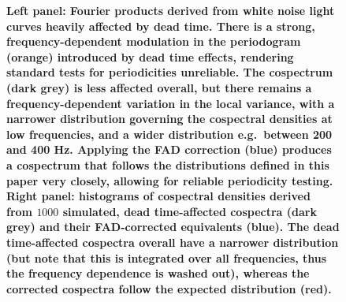 \documentclass[12pt]{emulateapj}
\begin{document}
\begin{figure}
\begin{center}
\caption{\textbf{Left panel: Fourier products derived from white noise light curves heavily affected by dead time. There is a strong, frequency-dependent modulation in the periodogram (orange) introduced by dead time effects, rendering standard tests for periodicities unreliable. The cospectrum (dark grey) is less affected overall, but there remains a frequency-dependent variation in the local variance, with a narrower distribution governing the cospectral densities at low frequencies, and a wider distribution e.g.\ between 200 and 400 Hz. Applying the FAD correction (blue) produces a cospectrum that follows the distributions defined in this paper very closely, allowing for reliable periodicity testing. Right panel: histograms of cospectral densities derived from $1000$ simulated, dead time-affected cospectra (dark grey) and their FAD-corrected equivalents (blue). The dead time-affected cospectra overall have a narrower distribution (but note that this is integrated over all frequencies, thus the frequency dependence is washed out), whereas the corrected cospectra follow the expected distribution (red).
}}
\label{fig:wn_dt}
\end{center}
\end{figure}
\end{document}
